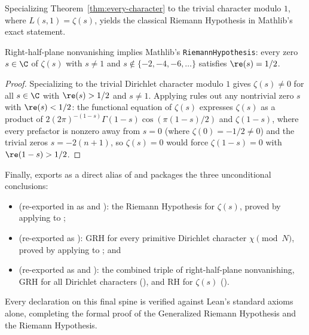 Specializing Theorem~\ref{thm:every-character} to the trivial character modulo
$1$, where $L(s, 1) = \zeta(s)$, yields the classical Riemann Hypothesis in
Mathlib's exact statement.

\begin{theorem}
\label{thm:rh-of-every}
Right-half-plane nonvanishing  implies
Mathlib's \texttt{RiemannHypothesis}: every zero $s \in \C$ of $\zeta(s)$ with
$s \neq 1$ and $s \notin \{-2, -4, -6, \dots\}$ satisfies $\re(s) = 1/2$.
\end{theorem}

\begin{proof}
Specializing  to the trivial Dirichlet
character modulo $1$ gives $\zeta(s) \neq 0$ for all $s \in \C$ with
$\re(s) > 1/2$ and $s \neq 1$. Applying 
rules out any nontrivial zero $s$ with $\re(s) < 1/2$: the functional equation
of $\zeta(s)$ expresses $\zeta(s)$ as a product of
$2 (2\pi)^{-(1-s)} \Gamma(1 - s) \cos(\pi(1-s)/2)$ and $\zeta(1 - s)$, where
every prefactor is nonzero away from $s = 0$ (where $\zeta(0) = -1/2 \neq 0$)
and the trivial zeros $s = -2(n+1)$, so $\zeta(s) = 0$ would force
$\zeta(1 - s) = 0$ with $\re(1 - s) > 1/2$.
\end{proof}

Finally,  exports
 as a direct alias of
 and packages the three
unconditional conclusions:
\begin{itemize}
  \item {} (re-exported in  as
   and ): the
  Riemann Hypothesis for $\zeta(s)$, proved by applying
   to ;
  \item {} (re-exported as
  ): GRH for every primitive
  Dirichlet character $\chi \pmod N$, proved by applying
   to ; and
  \item {} (re-exported as
   and
  ): the combined triple of right-half-plane
  nonvanishing, GRH for all Dirichlet characters (), and
  RH for $\zeta(s)$ ().
\end{itemize}
Every declaration on this final spine is verified against Lean's standard
axioms alone, completing the formal proof of the Generalized Riemann Hypothesis
and the Riemann Hypothesis.
